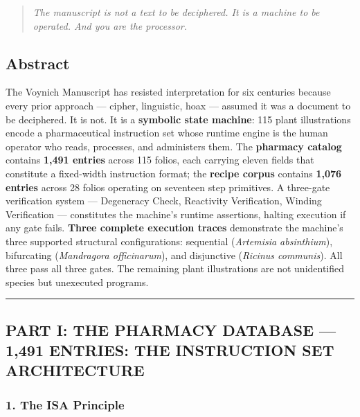 \begin{quote}
\emph{The manuscript is not a text to be deciphered. It is a machine to
be operated. And you are the processor.}
\end{quote}

\hypertarget{abstract}{%
\subsection{Abstract}\label{abstract}}

The Voynich Manuscript has resisted interpretation for six centuries
because every prior approach --- cipher, linguistic, hoax --- assumed it
was a document to be deciphered. It is not. It is a \textbf{symbolic
state machine}: 115 plant illustrations encode a pharmaceutical
instruction set whose runtime engine is the human operator who reads,
processes, and administers them. The \textbf{pharmacy catalog} contains
\textbf{1,491 entries} across 115 folios, each carrying eleven fields
that constitute a fixed-width instruction format; the \textbf{recipe
corpus} contains \textbf{1,076 entries} across 28 folios operating on
seventeen step primitives. A three-gate verification system ---
Degeneracy Check, Reactivity Verification, Winding Verification ---
constitutes the machine's runtime assertions, halting execution if any
gate fails. \textbf{Three complete execution traces} demonstrate the
machine's three supported structural configurations: sequential
(\emph{Artemisia absinthium}), bifurcating (\emph{Mandragora
officinarum}), and disjunctive (\emph{Ricinus communis}). All three pass
all three gates. The remaining plant illustrations are not unidentified
species but unexecuted programs.

\begin{center}\rule{0.5\linewidth}{0.5pt}\end{center}

\hypertarget{part-i-the-pharmacy-database-1491-entries-the-instruction-set-architecture}{%
\subsection{PART I: THE PHARMACY DATABASE --- 1,491 ENTRIES: THE
INSTRUCTION SET
ARCHITECTURE}\label{part-i-the-pharmacy-database-1491-entries-the-instruction-set-architecture}}

\hypertarget{the-isa-principle}{%
\subsubsection{1. The ISA Principle}\label{the-isa-principle}}


